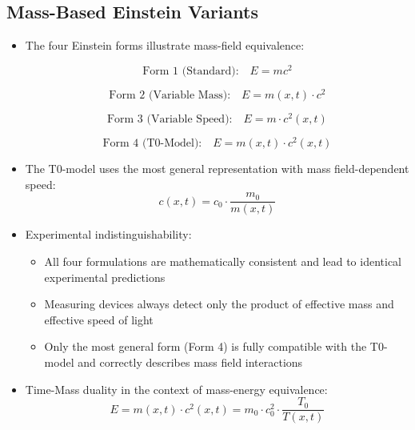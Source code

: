 \documentclass[12pt,a4paper]{article}
\begin{document}
\subsection{Mass-Based Einstein Variants}
\begin{itemize}
	\item The four Einstein forms illustrate mass-field equivalence:
	
	\begin{equation}
		\text{Form 1 (Standard):} \quad \boxed{E = mc^2}
	\end{equation}
	
	\begin{equation}
		\text{Form 2 (Variable Mass):} \quad \boxed{E = m(x,t) \cdot c^2}
	\end{equation}
	
	\begin{equation}
		\text{Form 3 (Variable Speed):} \quad \boxed{E = m \cdot c^2(x,t)}
	\end{equation}
	
	\begin{equation}
		\text{Form 4 (T0-Model):} \quad \boxed{E = m(x,t) \cdot c^2(x,t)}
	\end{equation}
	
	\item The T0-model uses the most general representation with mass field-dependent speed:
	\begin{equation}
		c(x,t) = c_0 \cdot \frac{m_0}{m(x,t)}
	\end{equation}
	
	\item Experimental indistinguishability:
	\begin{itemize}
		\item All four formulations are mathematically consistent and lead to identical experimental predictions
		\item Measuring devices always detect only the product of effective mass and effective speed of light
		\item Only the most general form (Form 4) is fully compatible with the T0-model and correctly describes mass field interactions
	\end{itemize}
	
	\item Time-Mass duality in the context of mass-energy equivalence:
	\begin{equation}
		E = m(x,t) \cdot c^2(x,t) = m_0 \cdot c_0^2 \cdot \frac{T_0}{T(x,t)}
	\end{equation}
\end{itemize}
\end{document}
